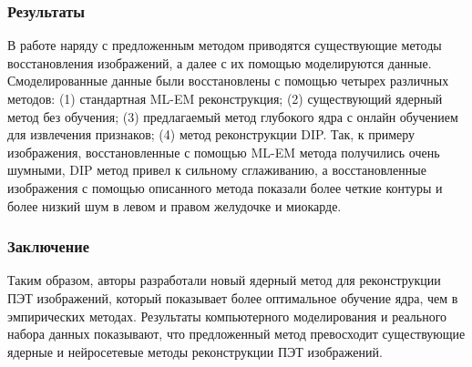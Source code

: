 \subsubsection*{Результаты}
В работе наряду с предложенным методом приводятся существующие методы восстановления 
изображений, а далее с их помощью моделируются данные. Смоделированные данные были восстановлены с 
помощью четырех различных методов: (1) стандартная ML-EM реконструкция; (2) существующий ядерный метод без обучения; 
(3) предлагаемый метод глубокого ядра с онлайн обучением для извлечения признаков; (4) метод реконструкции DIP. 
Так, к примеру изображения, восстановленные с помощью ML-EM метода получились очень шумными, DIP метод привел к сильному сглаживанию, 
а восстановленные изображения с помощью описанного метода показали более четкие контуры и более низкий шум в левом и правом желудочке и миокарде. \par
\subsubsection*{Заключение}
Таким образом, авторы разработали новый ядерный метод для реконструкции ПЭТ изображений, который показывает более 
оптимальное обучение ядра, чем в эмпирических методах. Результаты компьютерного моделирования и реального набора 
данных показывают, что предложенный метод превосходит существующие ядерные и нейросетевые методы реконструкции ПЭТ изображений.